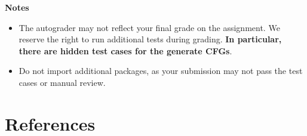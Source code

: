 \documentclass{article}
\begin{document}
    \vspace{3mm}
    \textbf{Notes}
    \begin{itemize}
        \item The autograder may not reflect your final grade on the assignment. We reserve the right to run additional tests during grading. \textbf{In particular, there are hidden test cases for the generate CFGs}.
        \item Do not import additional packages, as your submission may not pass the test cases or manual review.
    \end{itemize}

\section*{References}
\end{document}
